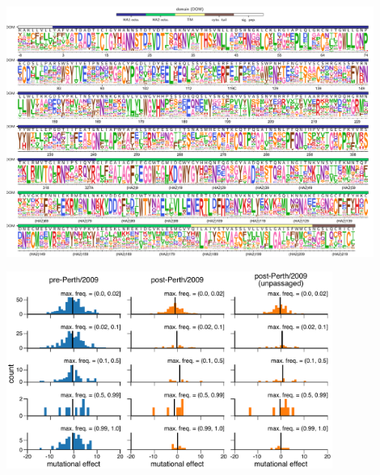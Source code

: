 \documentclass[9pt,twocolumn,twoside]{pnas-new}
\begin{document}
\begin{suppfigure}[H]
\centerline{\includegraphics[width=0.9\textwidth]{figs/supp_WSNprefs_logoplot/WSN-rescaled_prefs.pdf}}
\caption{\label{suppfig:WSNprefs_logoplot}
{\bf The site-specific amino-acid preferences of the WSN/1933 H1 HA.}
The amino-acid preferences of the WSN/1933 H1 HA from~\cite{doud2016accurate} after taking the average of the experimental replicates and re-scaling~\cite{hilton2017phydms} by a stringency parameter of 2.05 (see \url{https://github.com/jbloomlab/dms_tools2/blob/master/examples/Doud2016/analysis_notebook.ipynb}).
The overlays show the same information as in Figure~\ref{fig:logoplot} (domain and wildtype amino acid).
Note that \cite{doud2016accurate} used libraries in which all codons were mutagenized \emph{except} for the one encoding N-terminal methionine.
Therefore, no data is shown for the first codon in the gene.
The sites are in H3 numbering.
}
\end{suppfigure}

\begin{suppfigure}[H]
\centerline{\includegraphics[width=0.8\textwidth]{figs/supp_muteffect_maxfreq_WSN/muteffect_maxfreq_WSN_supp.pdf}}
\caption{\label{suppfig:muteffect_maxfreq_WSN_supp}
{\bf The distribution of mutational effects measured in H1 HA among H3N2 mutations binned by the maximum frequency that they reach.}
This figure repeats the analysis of the H3N2 mutation frequencies in Figure~\ref{fig:muteffect_maxfreq}B, but uses the deep mutational scanning data for an H1 HA as measured in \cite{doud2016accurate}.
}
\end{suppfigure}
\end{document}
